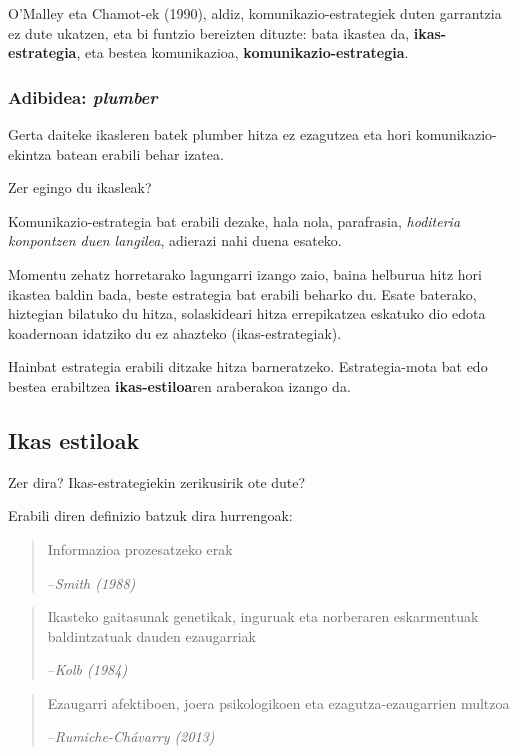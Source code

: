 \documentclass[
]{book}
\begin{document}
O'Malley eta Chamot-ek (1990), aldiz, komunikazio-estrategiek duten garrantzia ez dute ukatzen, eta bi funtzio bereizten dituzte: bata ikastea da, \textbf{ikas-estrategia}, eta bestea komunikazioa, \textbf{komunikazio-estrategia}.

\hypertarget{adibidea-plumber}{%
\subsubsection{\texorpdfstring{Adibidea: \emph{plumber}}{Adibidea: plumber}}\label{adibidea-plumber}}

Gerta daiteke ikasleren batek plumber hitza ez ezagutzea eta hori komunikazio-ekintza batean erabili behar izatea.

Zer egingo du ikasleak?

Komunikazio-estrategia bat erabili dezake, hala nola, parafrasia, \emph{hoditeria konpontzen duen langilea}, adierazi nahi duena esateko.

Momentu zehatz horretarako lagungarri izango zaio, baina helburua hitz hori ikastea baldin bada, beste estrategia bat erabili beharko du. Esate baterako, hiztegian bilatuko du hitza, solaskideari hitza errepikatzea eskatuko dio edota koadernoan idatziko du ez ahazteko (ikas-estrategiak).

Hainbat estrategia erabili ditzake hitza barneratzeko. Estrategia-mota bat edo bestea erabiltzea \textbf{ikas-estiloa}ren araberakoa izango da.

\hypertarget{ikas-estiloak}{%
\subsection{Ikas estiloak}\label{ikas-estiloak}}

Zer dira? Ikas-estrategiekin zerikusirik ote dute?

Erabili diren definizio batzuk dira hurrengoak:

\begin{quote}
Informazioa prozesatzeko erak

--\emph{Smith (1988)}
\end{quote}

\begin{quote}
Ikasteko gaitasunak genetikak, inguruak eta norberaren eskarmentuak baldintzatuak dauden ezaugarriak

--\emph{Kolb (1984)}
\end{quote}

\begin{quote}
Ezaugarri afektiboen, joera psikologikoen eta ezagutza-ezaugarrien multzoa

--\emph{Rumiche-Chávarry (2013)}
\end{quote}
\end{document}
